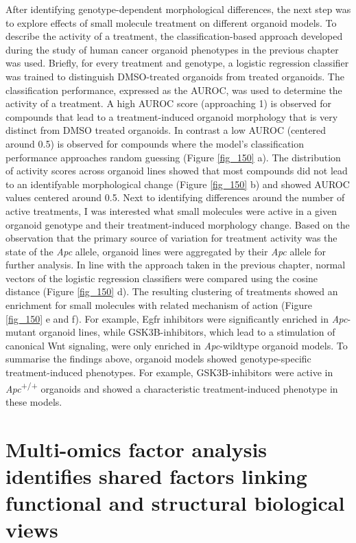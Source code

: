 \begin{flushleft}
After identifying genotype-dependent morphological differences, the next step was to explore effects of small molecule treatment on different organoid models. To describe the activity of a treatment, the classification-based approach developed during the study of human cancer organoid phenotypes in the previous chapter was used. Briefly, for every treatment and genotype, a logistic regression classifier was trained to distinguish DMSO-treated organoids from treated organoids. The classification performance, expressed as the AUROC, was used to determine the activity of a treatment. A high AUROC score (approaching 1) is observed for compounds that lead to a treatment-induced organoid morphology that is very distinct from DMSO treated organoids. In contrast a low AUROC (centered around 0.5) is observed for compounds where the model's classification performance approaches random guessing (Figure \ref{fig_150} a). The distribution of activity scores across organoid lines showed that most compounds did not lead to an identifyable morphological change (Figure \ref{fig_150} b) and showed AUROC values centered around 0.5. Next to identifying differences around the number of active treatments, I was interested what small molecules were active in a given organoid genotype and their treatment-induced morphology change. Based on the observation that the primary source of variation for treatment activity was the state of the \textit{Apc} allele, organoid lines were aggregated by their \textit{Apc} allele for further analysis. In line with the approach taken in the previous chapter, normal vectors of the logistic regression classifiers were compared using the cosine distance (Figure \ref{fig_150} d). The resulting clustering of treatments showed an enrichment for small molecules with related mechanism of action (Figure \ref{fig_150} e and f). For example, Egfr inhibitors were significantly enriched in \textit{Apc}-mutant organoid lines, while GSK3B-inhibitors, which lead to a stimulation of canonical Wnt signaling, were only enriched in \textit{Apc}-wildtype organoid models. To summarise the findings above, organoid models showed genotype-specific treatment-induced phenotypes. For example, GSK3B-inhibitors were active in \textit{Apc}\textsuperscript{+/+} organoids and showed a characteristic treatment-induced phenotype in these models.

\section{Multi-omics factor analysis identifies shared factors linking functional and structural biological views}


\end{flushleft}
